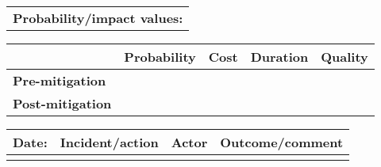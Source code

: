 \begin{table}
\begin{tabularx}{\textwidth}{| X |}
	\end{tabularx}
	\begin{tabularx}{\textwidth}{| X |}
		\hline
		\textbf{Probability/impact values:} \\
	\end{tabularx}
	\begin{tabularx}{\textwidth}{| l | l | X | X | X |}
		\hline
		 &  \textbf{Probability} & \textbf{Cost} & \textbf{Duration} & \textbf{Quality} \\ \hline
		\textbf{Pre-mitigation} &  &  &  &  \\ \hline
		\textbf{Post-mitigation} &  &  &  &  \\ \hline \hline
	\end{tabularx}
	\begin{tabularx}{\textwidth}{| l | X | l | X |}
		\hline
		\textbf{Date:} & \textbf{Incident/action} & \textbf{Actor} & \textbf{Outcome/comment} \\ \hline
		 &  &  &  \\ \hline
	\end{tabularx}%
\end{table}

